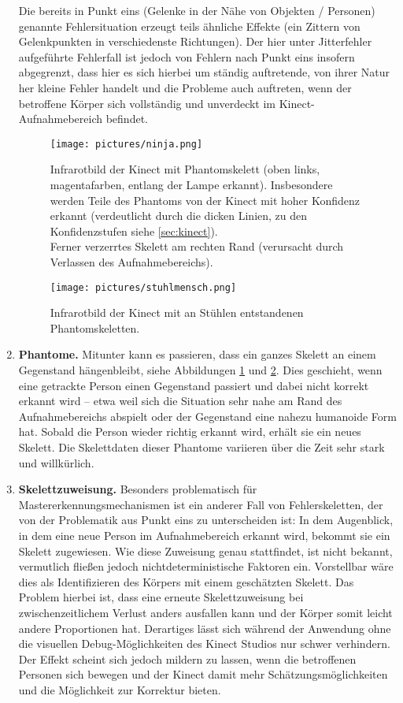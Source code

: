 \begin{enumerate}[label=(\roman*)]
		Die bereits in Punkt eins (Gelenke in der Nähe von Objekten / Personen) genannte Fehlersituation erzeugt teils ähnliche Effekte (ein \glqq{}Zittern\grqq{} von Gelenkpunkten in verschiedenste Richtungen). Der hier unter \glqq{}Jitterfehler\grqq{} aufgeführte Fehlerfall ist jedoch von Fehlern nach Punkt eins insofern abgegrenzt, dass hier es sich hierbei um ständig auftretende, von ihrer Natur her kleine Fehler handelt und die Probleme auch auftreten, wenn der betroffene Körper sich vollständig und unverdeckt im Kinect-Aufnahmebereich befindet.
				\begin{figure}[H]
	\centering
	\texttt{[image: pictures/ninja.png]}
	\caption{Infrarotbild der Kinect mit Phantomskelett (oben links, magentafarben, entlang der Lampe erkannt). Insbesondere werden Teile des Phantoms von der Kinect mit \glqq{}hoher Konfidenz\grqq{} erkannt (verdeutlicht durch die dicken Linien, zu den \glqq{}Konfidenzstufen\grqq{} siehe \ref{sec:kinect}).\\
	Ferner verzerrtes Skelett am rechten Rand (verursacht durch Verlassen des Aufnahmebereichs).}\label{fig:ninja}
	\end{figure}
			\begin{figure}[H]
	\centering
	\texttt{[image: pictures/stuhlmensch.png]}
	\caption{Infrarotbild der Kinect mit an Stühlen entstandenen Phantomskeletten.}\label{fig:stuhlmensch}
	\end{figure}
		\item\label{itm:problem4} \textbf{Phantome.} Mitunter kann es passieren, dass ein ganzes Skelett an einem Gegenstand \glqq{}hängenbleibt\grqq{}, siehe Abbildungen \ref{fig:ninja} und \ref{fig:stuhlmensch}. Dies geschieht, wenn eine getrackte Person einen Gegenstand passiert und dabei nicht korrekt erkannt wird -- etwa weil sich die Situation sehr nahe am Rand des Aufnahmebereichs abspielt oder der Gegenstand eine nahezu humanoide Form hat. Sobald die Person wieder richtig erkannt wird, erhält sie ein neues Skelett. Die Skelettdaten dieser Phantome  variieren über die Zeit sehr stark und willkürlich.\par
	\par
	\item\label{itm:problem5} \textbf{Skelettzuweisung.} Besonders problematisch für Mastererkennungsmechanismen ist ein anderer Fall von Fehlerskeletten, der von der Problematik aus Punkt eins zu unterscheiden ist: In dem Augenblick, in dem eine neue Person im Aufnahmebereich erkannt wird, bekommt sie ein Skelett zugewiesen. Wie diese Zuweisung genau stattfindet, ist nicht bekannt, vermutlich fließen jedoch nichtdeterministische Faktoren ein. Vorstellbar wäre dies als Identifizieren des Körpers mit einem geschätzten Skelett. Das Problem hierbei ist, dass eine erneute Skelettzuweisung bei zwischenzeitlichem Verlust anders ausfallen kann und der Körper somit leicht andere Proportionen hat. Derartiges lässt sich während der Anwendung ohne die visuellen Debug-Möglichkeiten des Kinect Studios nur schwer verhindern. Der Effekt scheint sich jedoch mildern zu lassen, wenn die betroffenen Personen sich bewegen und der Kinect damit mehr Schätzungsmöglichkeiten und die Möglichkeit zur Korrektur bieten.\par

\end{enumerate}
